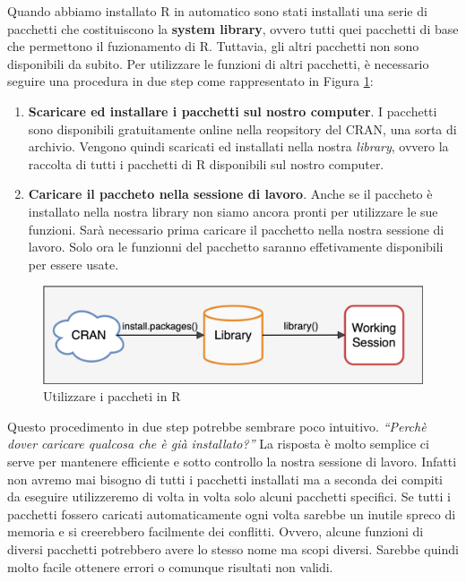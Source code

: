 \documentclass[
]{book}
\begin{document}
Quando abbiamo installato R in automatico sono stati installati una serie di pacchetti che costituiscono la \textbf{system library}, ovvero tutti quei pacchetti di base che permettono il fuzionamento di R. Tuttavia, gli altri pacchetti non sono disponibili da subito. Per utilizzare le funzioni di altri pacchetti, è necessario seguire una procedura in due step come rappresentato in Figura \ref{fig:packages-process}:

\begin{enumerate}
\def\labelenumi{\arabic{enumi}.}
\item
  \textbf{Scaricare ed installare i pacchetti sul nostro computer}. I pacchetti sono disponibili gratuitamente online nella reopsitory del CRAN, una sorta di archivio. Vengono quindi scaricati ed installati nella nostra \emph{library}, ovvero la raccolta di tutti i pacchetti di R disponibili sul nostro computer.
\item
  \textbf{Caricare il paccheto nella sessione di lavoro}. Anche se il paccheto è installato nella nostra library non siamo ancora pronti per utilizzare le sue funzioni. Sarà necessario prima caricare il pacchetto nella nostra sessione di lavoro. Solo ora le funzionni del pacchetto saranno effetivamente disponibili per essere usate.
\end{enumerate}

\begin{figure}

{\centering \includegraphics[width=0.95\linewidth]{images/packages-process} 

}

\caption{Utilizzare i paccheti in R}\label{fig:packages-process}
\end{figure}

Questo procedimento in due step potrebbe sembrare poco intuitivo. \emph{``Perchè dover caricare qualcosa che è già installato?''} La risposta è molto semplice ci serve per mantenere efficiente e sotto controllo la nostra sessione di lavoro. Infatti non avremo mai bisogno di tutti i pacchetti installati ma a seconda dei compiti da eseguire utilizzeremo di volta in volta solo alcuni pacchetti specifici. Se tutti i pacchetti fossero caricati automaticamente ogni volta sarebbe un inutile spreco di memoria e si creerebbero facilmente dei conflitti. Ovvero, alcune funzioni di diversi pacchetti potrebbero avere lo stesso nome ma scopi diversi. Sarebbe quindi molto facile ottenere errori o comunque risultati non validi.
\end{document}
